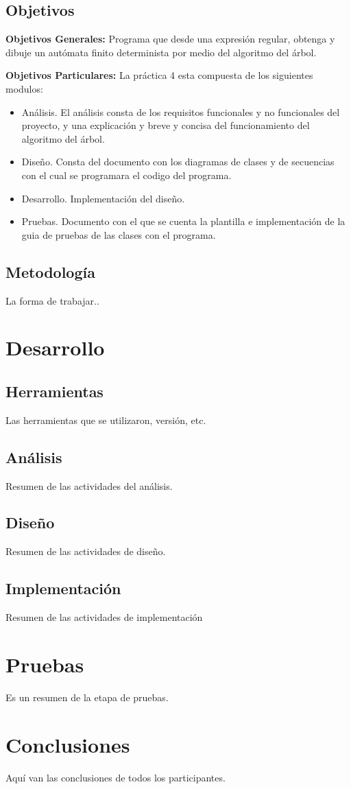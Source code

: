 \documentclass{book}
\begin{document}
\section{Objetivos}

{\bf Objetivos Generales:} Programa que desde una expresión regular, obtenga y dibuje un autómata finito determinista por medio del algoritmo del árbol.

{\bf Objetivos Particulares:} La práctica 4 esta compuesta de los siguientes modulos:

\begin{itemize}
	\item Análisis. El análisis consta de los requisitos funcionales y no funcionales del proyecto, y una explicación y breve y concisa del funcionamiento del algoritmo del árbol.
	\item Diseño. Consta del documento con los diagramas de clases y de secuencias con el cual se programara el codigo del programa.
	\item Desarrollo. Implementación del diseño.
	\item Pruebas. Documento con el que se cuenta la plantilla e implementación de la guia de pruebas de las clases con el programa.
\end{itemize}

\section{Metodología}

La forma de trabajar..

\chapter{Desarrollo}

\section{Herramientas}

Las herramientas que se utilizaron, versión, etc.

\section{Análisis}

Resumen de las actividades del análisis.

\section{Diseño}

Resumen de las actividades de diseño.

\section{Implementación}

Resumen de las actividades de implementación


\chapter{Pruebas}

Es un resumen de la etapa de pruebas.

\chapter{Conclusiones}

Aquí van las conclusiones de todos los participantes.
\end{document}
